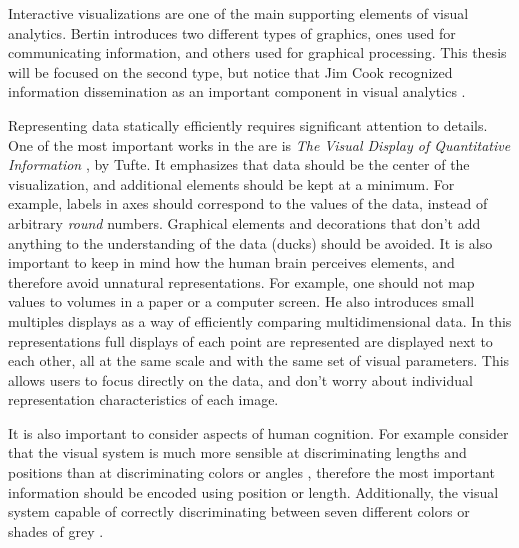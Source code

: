 Interactive visualizations are one of the main supporting elements of visual analytics. Bertin 
\autocite{bertin_graphics_1981} introduces two different types of graphics, ones used for communicating information, and others used for graphical processing. This thesis will be focused on the second type, but notice that Jim Cook recognized information dissemination as an important component in visual analytics \autocite{cook_illuminating_2005}.


Representing data statically efficiently requires significant attention to details. One of the most important works in the are is \emph{The Visual Display of Quantitative Information} \autocite{tufte_visual_1983} , by Tufte. It emphasizes that data should be the center of the visualization, and additional elements should be kept at a minimum. For example, labels in axes should correspond to the values of the data, instead of arbitrary \emph{round} numbers. Graphical elements and decorations that don't add anything to the understanding of the data (ducks) should be avoided. It is also important to keep in mind how the human brain perceives elements, and therefore avoid unnatural representations. For example, one should not map values to volumes in a paper or a computer screen. He also introduces small multiples displays as a way of efficiently comparing multidimensional data. In this representations full displays of each point are represented are displayed next to each other, all at the same scale and with the same set of visual parameters. This allows users to focus directly on the data, and don't worry about individual representation characteristics of each image.

It is also important to consider aspects of human cognition. For example consider that the visual system is much more sensible at discriminating lengths and positions than at discriminating colors or angles \autocite{ware_information_2004}, therefore the most important information should be encoded using position or length. Additionally, the visual system capable of correctly discriminating between seven different colors or shades of grey \autocite{miller_magical_1956}.




